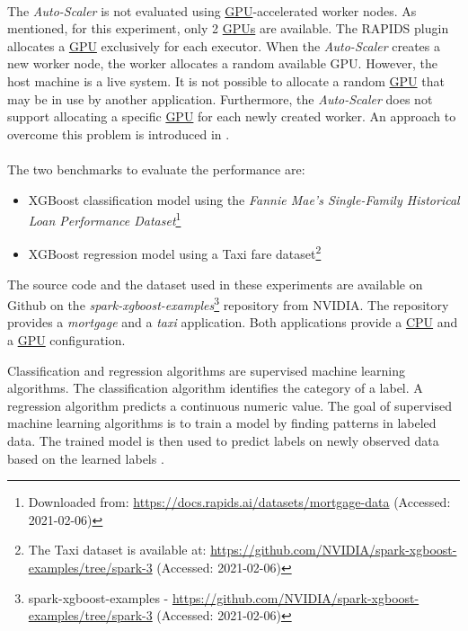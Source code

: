 \paragraph{}
The \textit{Auto-Scaler} is not evaluated using \hyperlink{abbr:gpu}{GPU}-accelerated worker nodes. As mentioned, for this experiment, only 2 \hyperlink{abbr:gpu}{GPUs} are available. The RAPIDS plugin allocates a \hyperlink{abbr:gpu}{GPU} exclusively for each executor. When the \textit{Auto-Scaler} creates a new worker node, the worker allocates a random available GPU.
However, the host machine is a live system. It is not possible to allocate a random \hyperlink{abbr:gpu}{GPU} that may be in use by another application. Furthermore, the \textit{Auto-Scaler} does not support allocating a specific \hyperlink{abbr:gpu}{GPU} for each newly created worker. An approach to overcome this problem is introduced in .

\paragraph{}
The two benchmarks to evaluate the performance are:
\begin{itemize}
\item XGBoost classification model using the \textit{Fannie Mae's Single-Family Historical Loan Performance Dataset}\footnote{Downloaded from: \url{https://docs.rapids.ai/datasets/mortgage-data} (Accessed: 2021-02-06)}\cite{Fannie2021Mortgage}

\item XGBoost regression model using a Taxi fare dataset\footnote{The Taxi dataset is available at: \url{https://github.com/NVIDIA/spark-xgboost-examples/tree/spark-3} (Accessed: 2021-02-06)}
\end{itemize}
The source code and the dataset used in these experiments are available on Github on the \textit{spark-xgboost-examples}\footnote{spark-xgboost-examples - \url{https://github.com/NVIDIA/spark-xgboost-examples/tree/spark-3} (Accessed: 2021-02-06)} repository from NVIDIA.
The repository provides a \textit{mortgage} and a \textit{taxi} application. Both applications provide a \hyperlink{abbr:cpu}{CPU} and a \hyperlink{abbr:gpu}{GPU} configuration.

Classification and regression algorithms are supervised machine learning algorithms.
The classification algorithm identifies the category of a label.
A regression algorithm predicts a continuous numeric value.
The goal of supervised machine learning algorithms is to train a model by finding patterns in labeled data. The trained model is then used to predict labels on newly observed data based on the learned labels \cite{Mcdonald2020SparkRapids}.


